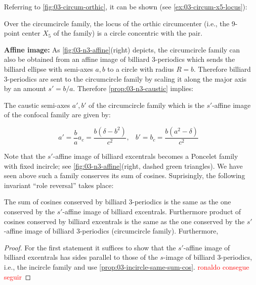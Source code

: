 Referring to  \cref{fig:03-circum-orthic}, it can be shown (see \cref{ex:03-circum-x5-locus}):

\begin{lemma}
Over the circumcircle family, the locus of the orthic circumcenter (i.e., the 9-point center $X_5$ of the family) is a circle concentric with the pair.
\label{lem:03-circum-x5-locus}
\end{lemma}


\noindent \textbf{Affine image:} As \cref{fig:03-n3-affine}(right) depicts, the circumcircle family can also be obtained from an affine image of billiard 3-periodics which sends the billiard ellipse with semi-axes $a,b$ to a circle with radius $R=b$. Therefore billiard 3-periodics are sent to the circumcircle family by scaling it along the major axis by an amount $s'={b/a}$. Therefore \cref{prop:03-n3-caustic} implies:

\begin{lemma}
The caustic semi-axes $a',b'$ of the circumcircle family which is the $s'$-affine image of the confocal family are given by:

\[ a'=\frac{b}{a}{a_c}=\frac{b(\delta-b^2)}{c^2},\;\;\;b'=b_c=\frac{b(a^2-\delta)}{c^2} \]
\label{lem:03-circumcircle-affine}
\end{lemma}

\noindent Note that the $s'$-affine image of billiard excentrals becomes a Poncelet family with fixed incircle; see \cref{fig:03-n3-affine}(right, dashed green triangles). We have seen above such a family conserves its sum of cosines. Suprisingly, the following invariant ``role reversal'' takes place:

\begin{proposition}
The sum of cosines conserved by billiard 3-periodics is the same as the one conserved by the $s'$-affine image of billiard excentrals. Furthermore product of cosines conserved by billiard excentrals is the same as the one conserved by the $s'$-affine image of billiard 3-periodics (circumcircle family). Furthermore, \label{prop:03-n3-role-reversal}
\end{proposition}

\begin{proof}
For the first statement it suffices to show that the $s'$-affine image of billiard excentrals has sides parallel to those of the $s$-image of billiard 3-periodics, i.e., the incircle family and use \cref{prop:03-incircle-same-sum-cos}.
\textcolor{red}{ronaldo consegue seguir}
\end{proof}

